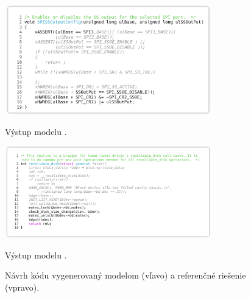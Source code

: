 \begin{figure}[H]
    \centering
    \includegraphics[width=0.8\textwidth]{obrazky/fim1.png}\\
    \caption{Výstup modelu \MCfim{}.}
    \label{fig:fim1}
\end{figure}

\begin{figure}[H]
    \centering
    \includegraphics[width=0.8\textwidth]{obrazky/fim321.png}\\
    \caption{Výstup modelu \MCfim{}.}
    \label{fig:fim321}
\end{figure}

\begin{figure}[H]
    \centering
    \caption{Návrh kódu vygenerovaný modelom \MCfim{} (vľavo) a referenčné riešenie (vpravo).}
    \label{fig:fim2}
\end{figure}

